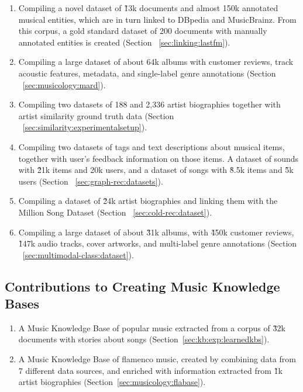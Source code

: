 \begin{enumerate}

\item 
Compiling a novel dataset of \~13k documents and almost 150k annotated musical entities, which are in turn linked to DBpedia and MusicBrainz. From this corpus, a gold standard dataset of 200 documents with manually annotated entities is created (Section ~\ref{sec:linking:lastfm}).

\item
Compiling a large dataset of about 64k albums with customer reviews, track acoustic features, metadata, and single-label genre annotations (Section ~\ref{sec:musicology:mard}).

\item
Compiling two datasets of 188 and 2,336 artist biographies together with artist similarity ground truth data (Section ~\ref{sec:similarity:experimentalsetup}).

\item
Compiling two datasets of tags and text descriptions about musical items, together with user's feedback information on those items. A dataset of sounds with \~21k items and 20k users, and a dataset of songs with \~8.5k items and \~5k users (Section ~\ref{sec:graph-rec:datasets}).

\item
Compiling a dataset of \~24k artist biographies and linking them with the Million Song Dataset (Section ~\ref{sec:cold-rec:dataset}).

\item
Compiling a large dataset of about \~31k albums, with \~450k customer reviews, \~147k audio tracks, cover artworks, and multi-label genre annotations (Section ~\ref{sec:multimodal-class:dataset}).

\end{enumerate}

\subsection{Contributions to Creating Music Knowledge Bases}

\begin{enumerate}
\item
A Music Knowledge Base of popular music extracted from a corpus of \~32k documents with stories about songs (Section~\ref{sec:kb:exp:learnedkbs}).

\item
A Music Knowledge Base of flamenco music, created by combining data from 7 different data sources, and enriched with information extracted from \~1k artist biographies (Section~\ref{sec:musicology:flabase}).

\end{enumerate}

